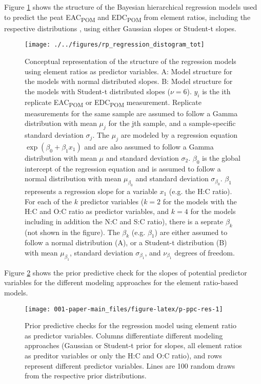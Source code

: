 \documentclass[alpha-refs, lineno]{wiley-article-rmd}
\begin{document}
\clearpage

Figure \ref{fig:p-reg-distogram-res} shows the structure of the Bayesian hierarchical regression models used to predict the peat EAC\textsubscript{POM} and EDC\textsubscript{POM} from element ratios, including the respective distributions \autocite{Kruschke.2015,Baath.2018}, using either Gaussian slopes or Student-t slopes.

\begin{figure}[H]

{\centering \texttt{[image: ./../figures/rp\_regression\_distogram\_tot]}

}

\caption{Conceptual representation of the structure of the regression models \cite{Kruschke.2015, Baath.2018} using element ratios as predictor variables. A: Model structure for the models with normal distributed slopes. B: Model structure for the models with Student-t distributed slopes ($\nu = 6$). $y_i$ is the ith replicate EAC\textsubscript{POM} or EDC\textsubscript{POM} measurement. Replicate measurements for the same sample are assumed to follow a Gamma distribution with mean $\mu_j$ for the jth sample, and a sample-specific standard deviation $\sigma_j$. The $\mu_j$ are modeled by a regression equation $\exp\left(\beta_0 + \beta_1 x_1\right)$ and are also assumed to follow a Gamma distribution with mean $\mu$ and standard deviation $\sigma_2$. $\beta_0$ is the global intercept of the regression equation and is assumed to follow a normal distribution with mean $\mu_{\beta_0}$ and standard deviation $\sigma_{\beta_0}$. $\beta_1$ represents a regression slope for a variable $x_1$ (e.g. the H:C ratio). For each of the $k$ predictor variables ($k=2$ for the models with the H:C and O:C ratio as predictor variables, and $k=4$ for the models including in addition the N:C and S:C ratio), there is a seprate $\beta_k$ (not shown in the figure). The $\beta_k$ (e.g. $\beta_1$) are either assumed to follow a normal distribution (A), or a Student-t distribution (B) with mean $\mu_{\beta_1}$, standard deviation $\sigma_{\beta_1}$, and $\nu_{\beta_1}$ degrees of freedom.}\label{fig:p-reg-distogram-res}
\end{figure}

\clearpage

Figure \ref{fig:p-ppc-res} shows the prior predictive check for the slopes of potential predictor variables for the different modeling approaches for the element ratio-based models.

\begin{figure}[H]

{\centering \texttt{[image: 001-paper-main\_files/figure-latex/p-ppc-res-1]}

}

\caption{Prior predictive checks for the regression model using element ratio as predictor variables. Columns differentiate different modeling approaches (Gaussian or Student-t prior for slopes, all element ratios as preditor variables or only the H:C and O:C ratio), and rows represent different predictor variables. Lines are 100 random draws from the respective prior distributions.}\label{fig:p-ppc-res}
\end{figure}
\end{document}
